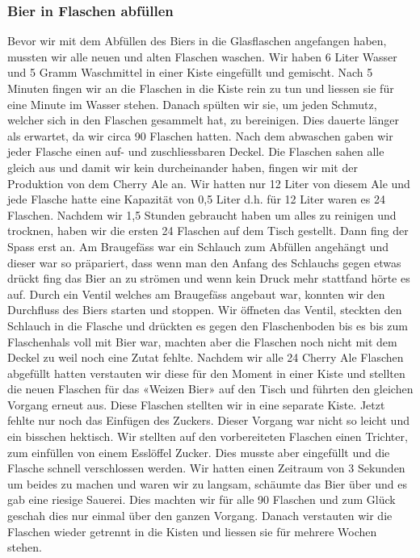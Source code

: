 \subsubsection{Bier in Flaschen abfüllen}
Bevor wir mit dem Abfüllen des Biers in die Glasflaschen angefangen haben, mussten wir alle neuen und alten Flaschen waschen. Wir haben 6 Liter Wasser und 5 Gramm Waschmittel in einer Kiste eingefüllt und gemischt. Nach 5 Minuten fingen wir an die Flaschen in die Kiste rein zu tun und liessen sie für eine Minute im Wasser stehen. Danach spülten wir sie, um jeden Schmutz, welcher sich in den Flaschen gesammelt hat, zu bereinigen. Dies dauerte länger als erwartet, da wir circa 90 Flaschen hatten. Nach dem abwaschen gaben wir jeder Flasche einen auf- und zuschliessbaren Deckel. Die Flaschen sahen alle gleich aus und damit wir kein durcheinander haben, fingen wir mit der Produktion von dem Cherry Ale an. Wir hatten nur 12 Liter von diesem Ale und jede Flasche hatte eine Kapazität von 0,5 Liter d.h. für 12 Liter waren es 24 Flaschen. Nachdem wir 1,5 Stunden gebraucht haben um alles zu reinigen und trocknen, haben wir die ersten 24 Flaschen auf dem Tisch gestellt. Dann fing der Spass erst an. Am Braugefäss war ein Schlauch zum Abfüllen angehängt und dieser war so präpariert, dass wenn man den Anfang des Schlauchs gegen etwas drückt fing das Bier an zu strömen und wenn kein Druck mehr stattfand hörte es auf. Durch ein Ventil welches am Braugefäss angebaut war, konnten wir den Durchfluss des Biers starten und stoppen.
Wir öffneten das Ventil, steckten den Schlauch in die Flasche und drückten es gegen den Flaschenboden bis es bis zum Flaschenhals voll mit Bier war, machten aber die Flaschen noch nicht mit dem Deckel zu weil noch eine Zutat fehlte. Nachdem wir alle 24 Cherry Ale Flaschen abgefüllt hatten verstauten wir diese für den Moment in einer Kiste und stellten die neuen Flaschen für das «Weizen Bier» auf den Tisch und führten den gleichen Vorgang erneut aus. Diese Flaschen stellten wir in eine separate Kiste. Jetzt fehlte nur noch das Einfügen des Zuckers. Dieser Vorgang war nicht so leicht und ein bisschen hektisch. Wir stellten auf den vorbereiteten Flaschen einen Trichter, zum einfüllen von einem Esslöffel Zucker. Dies musste aber eingefüllt und die Flasche schnell verschlossen werden. Wir hatten einen Zeitraum von 3 Sekunden um beides zu machen und waren wir zu langsam, schäumte das Bier über und es gab eine riesige Sauerei. Dies machten wir für alle 90 Flaschen und zum Glück geschah dies nur einmal über den ganzen Vorgang. Danach verstauten wir die Flaschen wieder getrennt in die Kisten und liessen sie für mehrere Wochen stehen.

